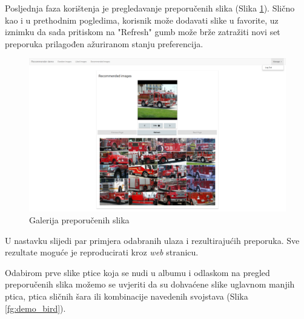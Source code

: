 \documentclass[times, utf8, proizvoljni, numeric]{fer}
\begin{document}
Posljednja faza korištenja je pregledavanje preporučenih slika (Slika \ref{fg:demo_recommended}). Slično kao i u prethodnim pogledima, korisnik može dodavati slike u favorite, uz iznimku da sada pritiskom na "Refresh" gumb može brže zatražiti novi set preporuka prilagođen ažuriranom stanju preferencija. 

\begin{figure}[H]
	\begin{center}
		\captionsetup{justification=centering}
		\includegraphics[width=1.0\textwidth]{./imgs/demo-preporucitelja-po-sadrzaju/tijek-rada/demo-reco.png}
		\caption{Galerija preporučenih slika}
		\label{fg:demo_recommended}
	\end{center}
\end{figure}


U nastavku slijedi par primjera odabranih ulaza i rezultirajućih preporuka. Sve rezultate moguće je reproducirati kroz \textit{web} stranicu. 

Odabirom prve slike ptice koja se nudi u albumu i odlaskom na pregled preporučenih slika možemo se uvjeriti da su dohvaćene slike uglavnom manjih ptica, ptica sličnih šara ili kombinacije navedenih svojstava (Slika \ref{fg:demo_bird}). 
\end{document}
